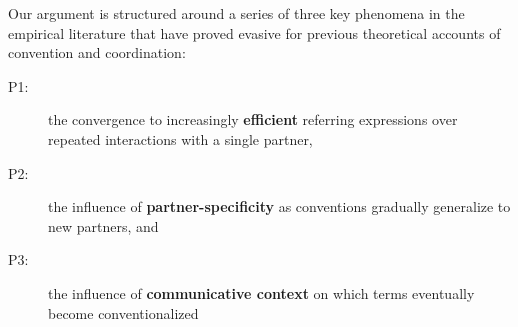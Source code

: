 
Our argument is structured around a series of three key phenomena in the empirical literature that have proved evasive for previous theoretical accounts of convention and coordination: 
\begin{description}
\item[P1:] the convergence to increasingly \textbf{efficient} referring expressions over repeated interactions with a single partner,
\item[P2:] the influence of \textbf{partner-specificity} as conventions gradually generalize to new partners, and
\item[P3:] the influence of \textbf{communicative context} on which terms eventually become conventionalized 
\end{description}

